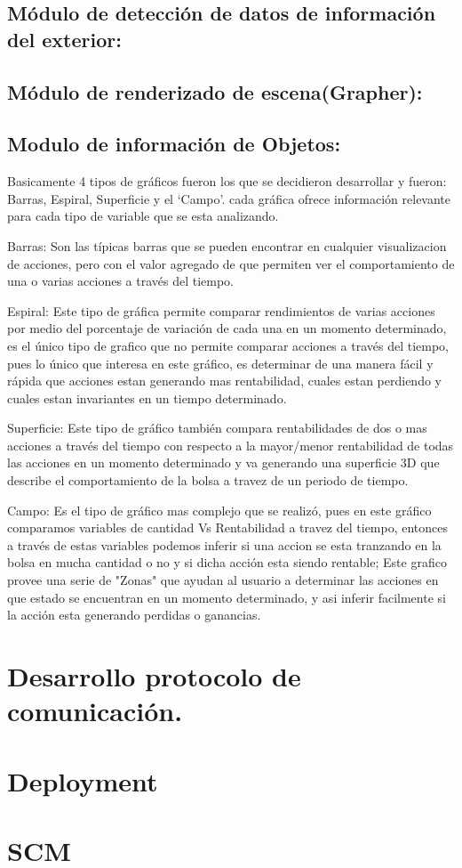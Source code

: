 \subsection{Módulo de detección de datos de información del exterior:}

\subsection{Módulo de renderizado de escena(Grapher):}

\subsection{Modulo de información de Objetos:}



Basicamente 4 tipos de gráficos fueron los que se decidieron desarrollar y fueron: Barras, Espiral, Superficie y el `Campo'. cada gráfica ofrece información relevante para cada tipo de variable que se esta analizando. 

Barras: Son las típicas barras que se pueden encontrar en cualquier visualizacion de acciones, pero con el valor agregado de que permiten ver el comportamiento de una o varias acciones a través del tiempo.

Espiral: Este tipo de gráfica permite comparar rendimientos de varias acciones por medio del porcentaje de variación de cada una en un momento determinado, es el único tipo de grafico que no permite comparar acciones a través del tiempo, pues lo único que interesa en este gráfico, es determinar de una manera fácil y rápida que acciones estan generando mas rentabilidad, cuales estan perdiendo y cuales estan invariantes en un tiempo determinado.

Superficie: Este tipo de gráfico también compara rentabilidades de dos o mas acciones a través del tiempo con respecto a la mayor/menor  rentabilidad de todas las acciones en un momento determinado  y va generando una superficie 3D que describe el comportamiento de la bolsa a travez de un periodo de tiempo.

Campo: Es el tipo de gráfico mas complejo que se realizó, pues en este gráfico comparamos variables de cantidad Vs Rentabilidad a travez del tiempo, entonces a través de estas variables podemos inferir si una accion se esta tranzando en la bolsa en mucha cantidad o no y si dicha acción esta siendo rentable; Este grafico provee una serie de "Zonas" que ayudan al usuario a determinar las acciones en que estado se encuentran en un momento determinado, y asi inferir facilmente si la acción esta generando perdidas o ganancias.

 

\section{Desarrollo protocolo de comunicación.}

\section{Deployment}

\section{SCM}